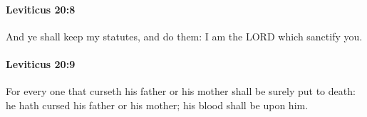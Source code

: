 		\paragraph{Leviticus 20:8} %
			\label{LEVITICUS-20-8}

			And ye shall keep my statutes, and do them: I am the LORD which sanctify you.


		\paragraph{Leviticus 20:9} %
			\label{LEVITICUS-20-9}

			For every one that curseth his father or his mother shall be surely put to death: he hath cursed his father or his mother; his blood shall be upon him.



